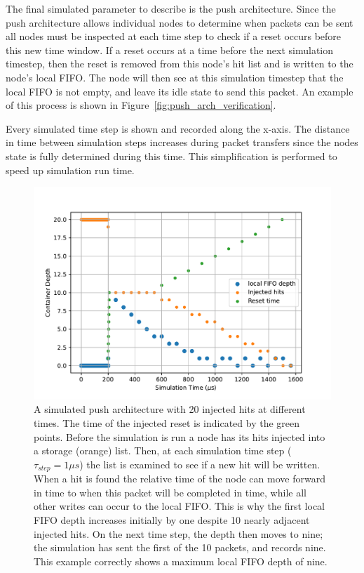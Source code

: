 The final simulated parameter to describe is the push architecture.
Since the push architecture allows individual nodes to determine when packets can be sent all nodes must be inspected at each time step to check if a reset occurs before this new time window.
If a reset occurs at a time before the next simulation timestep, then the reset is removed from this node's hit list and is written to the node's local FIFO.
The node will then see at this simulation timestep that the local FIFO is not empty, and leave its idle state to send this packet.
An example of this process is shown in Figure~\ref{fig:push_arch_verification}.

Every simulated time step is shown and recorded along the x-axis.
The distance in time between simulation steps increases during packet transfers since the nodes state is fully determined during this time.
This simplification is performed to speed up simulation run time.

\begin{figure}[]
\centering
\includegraphics[width=\textwidth]{images/push_arch_buff.pdf}
\caption{A simulated push architecture with 20 injected hits at different times.
The time of the injected reset is indicated by the green points.
Before the simulation is run a node has its hits injected into a storage (orange) list.
Then, at each simulation time step ($\tau_{step}=1\unit{\mu s}$) the list is examined to see if a new hit will be written.
When a hit is found the relative time of the node can move forward in time to when this packet will be completed in time, while all other writes can occur to the local FIFO.
This is why the first local FIFO depth increases initially by one despite 10 nearly adjacent injected hits.
On the next time step, the depth then moves to nine; the simulation has sent the first of the 10 packets, and records nine.
This example correctly shows a maximum local FIFO depth of nine.
}
\end{figure}~\label{fig:push_arch_verification}
